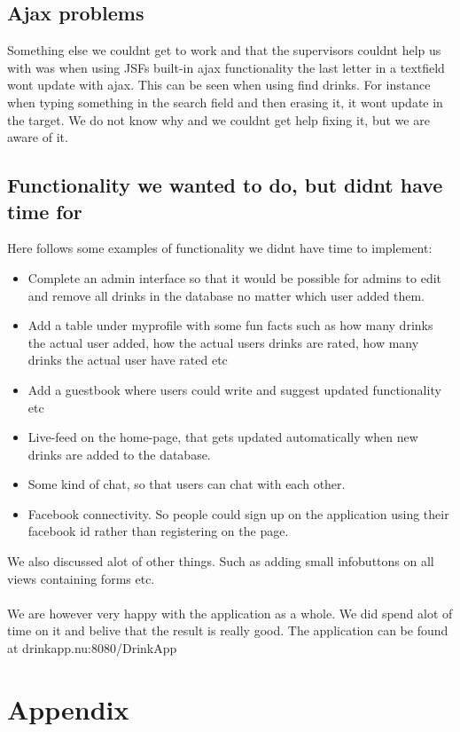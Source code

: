 \documentclass[a4paper]{article}
\begin{document}
\subsection{Ajax problems}
Something else we couldnt get to work and that the supervisors couldnt help us with was when using JSFs built-in ajax functionality the last letter in a textfield wont update with ajax.
This can be seen when using find drinks. For instance when typing something in the search field and then erasing it, it wont update in the target. We do not know why and we couldnt get help fixing it, but we are aware of it.

\subsection{Functionality we wanted to do, but didnt have time for}
Here follows some examples of functionality we didnt have time to implement:
\begin{itemize}
\item Complete an admin interface so that it would be possible for admins to edit and remove all drinks in the database no matter which user added them.
\item Add a table under myprofile with some fun facts such as how many drinks the actual user added, how the actual users drinks are rated, how many drinks the actual user have rated etc
\item Add a guestbook where users could write and suggest updated functionality etc
\item Live-feed on the home-page, that gets updated automatically when new drinks are added to the database.
\item Some kind of chat, so that users can chat with each other.
\item Facebook connectivity. So people could sign up on the application using their facebook id rather than registering on the page.
\end{itemize}

We also discussed alot of other things. Such as adding small infobuttons on all views containing forms etc. \\
\\
We are however very happy with the application as a whole. We did spend alot of time on it and belive that the result is really good. The application can be found at drinkapp.nu:8080/DrinkApp

\section{Appendix}
\end{document}
